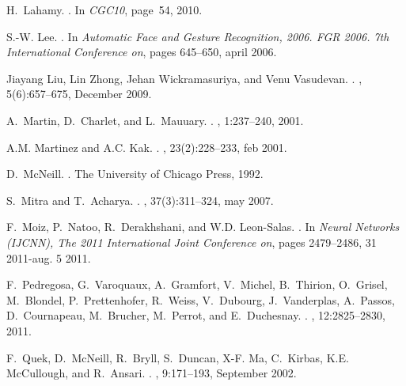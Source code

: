 \documentclass[]{article}
\begin{document}
\begin{thebibliography}{10}
H.~Lahamy.
.
\newblock In {\em {CGC10}}, page~54, 2010.

S.-W. Lee.
.
\newblock In {\em {Automatic Face and Gesture Recognition, 2006. FGR 2006. 7th
  International Conference on}}, pages 645--650, april 2006.

Jiayang Liu, Lin Zhong, Jehan Wickramasuriya, and Venu Vasudevan.
.
, 5(6):657--675, December 2009.

A.~Martin, D.~Charlet, and L.~Mauuary.
.
, 1:237--240, 2001.

A.M. Martinez and A.C. Kak.
.
, 23(2):228--233, feb 2001.

D.~McNeill.
.
\newblock The University of Chicago Press, 1992.

S.~Mitra and T.~Acharya.
.
, 37(3):311--324, may 2007.

F.~Moiz, P.~Natoo, R.~Derakhshani, and W.D. Leon-Salas.
.
\newblock In {\em {Neural Networks (IJCNN), The 2011 International Joint
  Conference on}}, pages 2479--2486, 31 2011-aug. 5 2011.

F.~Pedregosa, G.~Varoquaux, A.~Gramfort, V.~Michel, B.~Thirion, O.~Grisel,
  M.~Blondel, P.~Prettenhofer, R.~Weiss, V.~Dubourg, J.~Vanderplas, A.~Passos,
  D.~Cournapeau, M.~Brucher, M.~Perrot, and E.~Duchesnay.
.
, 12:2825--2830, 2011.

F.~Quek, D.~McNeill, R.~Bryll, S.~Duncan, X-F. Ma, C.~Kirbas, K.E. McCullough,
  and R.~Ansari.
.
, 9:171--193, September 2002.


\end{thebibliography}
\end{document}
